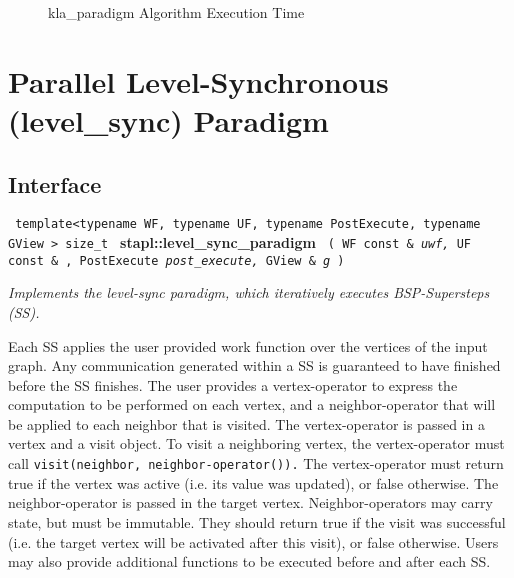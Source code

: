 \begin{figure}[p]
\caption{ kla\_paradigm Algorithm Execution Time}
\label{fig:kla-para-alg-exec-exper}
\end{figure}


\section{ Parallel Level-Synchronous (level\_sync) Paradigm}
\label{sec-level-sync-alg}

\subsection{Interface} \label{sec-level-sync-alg-inter}

\noindent
\texttt{%
template<typename WF, typename UF, typename PostExecute, typename GView >
\newline
size\_t 
}
\newline
\textbf{stapl::level\_sync\_paradigm}%
\newline
\texttt{%
(
WF const \&
\textit{uwf,}%
UF const \& ,
PostExecute
\textit{post\_execute,}%
GView \&
\textit{g}%
)     
}
\vspace{0.4cm}

\textit{
Implements the level-sync paradigm, which iteratively executes BSP-Supersteps (SS). 
}
\vspace{0.4cm}

Each SS applies the user provided work function over the vertices of the input graph. Any communication generated within a SS is guaranteed to have finished before the SS finishes. The user provides a vertex-operator to express the computation to be performed on each vertex, and a neighbor-operator that will be applied to each neighbor that is visited. The vertex-operator is passed in a vertex and a visit object. To visit a neighboring vertex, the vertex-operator must call 
\texttt{visit(neighbor, neighbor-operator()).} 
The vertex-operator must return true if the vertex was active (i.e. its value was updated), or false otherwise. The neighbor-operator is passed in the target vertex. Neighbor-operators may carry state, but must be immutable. They should return true if the visit was successful (i.e. the target vertex will be activated after this visit), or false otherwise. Users may also provide additional functions to be executed before and after each SS.

